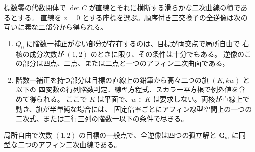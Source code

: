 \begin{theorem}\label{thm:marked-transverse-conic-commutators}
標数零の代数閉体で $\det C$ が直線とそれに横断する滑らかな二次曲線の積であるとする。
直線を $x=0$ とする座標を選ぶ。順序付き三交換子の全逆像は次の互いに素な二部分から得られる。
\begin{enumerate}
\item $Q_0$ に階数一補正がない部分が存在するのは、目標が両交点で局所自由で
右核の成分次数が $(1,2)$ のときに限り、その条件は十分でもある。
逆像のこの部分は四点、二点、または二点と一つのアフィン二次曲面である。
\item 階数一補正を持つ部分は目標の直線上の鉛筆から高々二つの旗 $(K,kw)$ と以下の
四変数の行列階数判定、線型方程式、スカラー平方根で例外値を含めて得られる。
ここで $K$ は平面で、$w\in K$ は要求しない。両核が直線上で動き、旗が半単純な場合には、
固定倍率ごとにアフィン線型空間上の一つの二次式、または二行三列の階数一以下の条件で尽きる。
\end{enumerate}
局所自由で次数 $(1,2)$ の目標の一般点で、全逆像は四つの孤立解と
$\mathbf G_m$ に同型な二つのアフィン二次曲線である。
\end{theorem}

